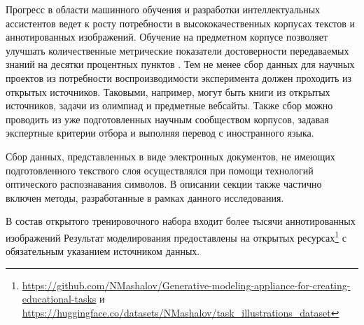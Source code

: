 Прогресс в области машинного обучения и разработки интеллектуальных ассистентов ведет к росту потребности в
высококачественных корпусах текстов и аннотированных изображений. Обучение на предметном корпусе
позволяет улучшать количественные метрические показатели достоверности передаваемых знаний 
на десятки процентных пунктов \cite{tinn2023fine}. Тем не менее сбор данных для научных проектов из
потребности воспроизводимости эксперимента должен проходить из открытых источников. Таковыми, например,
могут быть книги из открытых источников, задачи из олимпиад и предметные вебсайты. Также 
сбор можно проводить из уже подготовленных научным сообществом корпусов, задавая экспертные критерии
отбора и выполняя перевод с иностранного языка. 

Сбор данных, представленных в виде электронных документов, не имеющих
подготовленного текствого слоя осуществлялся при помощи технологий оптического распознавания символов.
В описании секции также частично включен методы, разработанные в рамках данного исследования.

В состав открытого тренировочного набора входит более тысячи аннотированных изображений  
Результат моделирования предоставлены на открытых ресурсах\footnote{
\url{https://github.com/NMashalov/Generative-modeling-appliance-for-creating-educational-tasks}
и \url{https://huggingface.co/datasets/NMashalov/task_illustrations_dataset}
} с обязательным указанием источником данных.